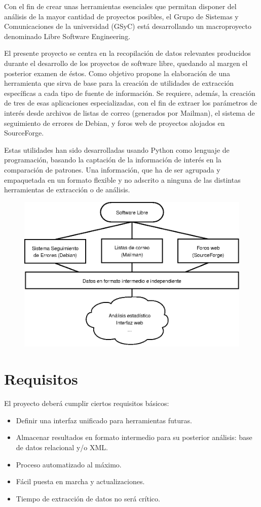 Con el fin de crear unas herramientas esenciales que permitan disponer del
análisis de la mayor cantidad de proyectos posibles, el Grupo de Sistemas
y Comunicaciones de la universidad (GSyC) está desarrollando un macroproyecto
denominado Libre Software Engineering.

El presente proyecto se centra en la recopilación de datos relevantes producidos
durante el desarrollo de los proyectos de software libre, quedando al margen
el posterior examen de éstos. Como objetivo propone la elaboración de una
herramienta que sirva de base para la creación de utilidades de extracción
específicas a cada tipo de fuente de información. Se requiere, además, la
creación de tres de esas aplicaciones especializadas, con el fin de extraer
los parámetros de interés desde archivos de listas de correo (generados por
Mailman), el sistema de seguimiento de errores de Debian, y foros web de
proyectos alojados en SourceForge.

Estas utilidades han sido desarrolladas usando Python como lenguaje
de programación, basando la captación de la información de interés
en la comparación de patrones. Una información, que ha de ser agrupada y
empaquetada en un formato flexible y no adscrito a ninguna de las distintas
herramientas de extracción o de análisis.

\begin{figure}[H]
  \centering
  \includegraphics[width=14cm, keepaspectratio]{img/descrip}
  \label{figura:descript}
\end{figure}



\section{Requisitos}
El proyecto deberá cumplir ciertos requisitos básicos:
\begin{itemize}
\item Definir una interfaz unificado para herramientas futuras.
\item Almacenar resultados en formato intermedio para su posterior análisis:
  base de datos relacional y/o XML.
\item Proceso automatizado al máximo.
\item Fácil puesta en marcha y actualizaciones.
\item Tiempo de extracción de datos no será crítico.
\end{itemize}


